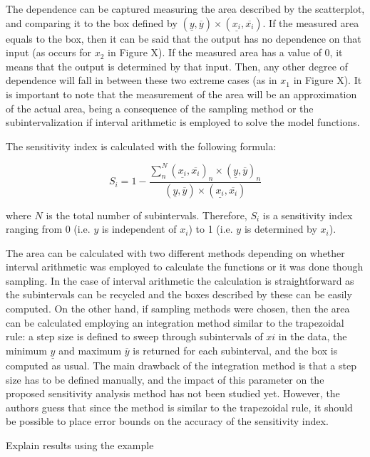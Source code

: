 \documentclass[twocolumn]{rps-esrel2022}
\begin{document}
The dependence can be captured measuring the area described by the scatterplot, and comparing it to the box defined by $(\underline{y},\overline{y})\times(\underline{x_i},\overline{x_i})$.
If the measured area equals to the box, then it can be said that the output has no dependence on that input (as occurs for $x_2$ in Figure X).
If the measured area has a value of 0, it means that the output is determined by that input.
Then, any other degree of dependence will fall in between these two extreme cases (as in $x_1$ in Figure X).
It is important to note that the measurement of the area will be an approximation of the actual area, being a consequence of the sampling method or the subintervalization
if interval arithmetic is employed to solve the model functions.

The sensitivity index is calculated with the following formula:

\begin{equation}
	S_i = 1 - \frac{\sum_n^N(\underline{x_i},\overline{x_i})_n\times(\underline{y},\overline{y})_n}{(\underline{y},\overline{y})\times(\underline{x_i},\overline{x_i})}
\end{equation}

where $N$ is the total number of subintervals.
Therefore, $S_i$ is a sensitivity index ranging from 0 (i.e. $y$ is independent of $x_i$) to 1 (i.e. $y$ is determined by $x_i$).

The area can be calculated with two different methods depending on whether interval arithmetic was employed to calculate the functions or it was done though sampling.
In the case of interval arithmetic the calculation is straightforward as the subintervals can be recycled and the boxes described by these can be easily computed.
On the other hand, if sampling methods were chosen, then the area can be calculated employing an integration method similar to the trapezoidal rule: a step size is defined to
sweep through subintervals of $xi$ in the data, the minimum $\underline{y}$ and maximum $\overline{y}$ is returned for each subinterval, and the box is computed as usual.
The main drawback of the integration method is that a step size has to be defined manually, and the impact of this parameter on the proposed sensitivity analysis method has not
been studied yet.
However, the authors guess that since the method is similar to the trapezoidal rule, it should be possible to place error bounds on the accuracy of the sensitivity index.

Explain results using the example
\end{document}
